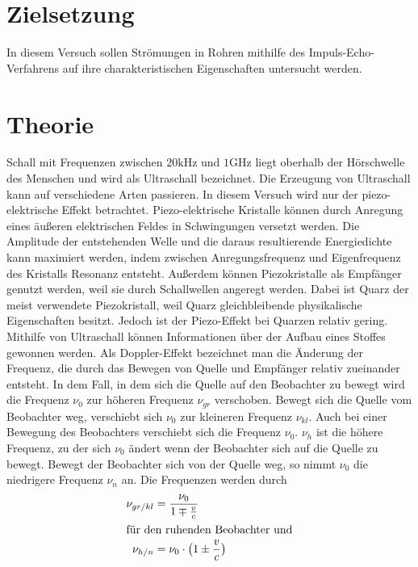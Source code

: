 \section{Zielsetzung}
\label{sec:Zielsetzung}

In diesem Versuch sollen Strömungen in Rohren mithilfe des Impuls-Echo-Verfahrens auf ihre charakteristischen Eigenschaften untersucht werden.

\section{Theorie}
\label{sec:Theorie}

Schall mit Frequenzen zwischen $20 \si{\kilo\Hz}$ und $1 \si{\giga\Hz}$ liegt oberhalb der Hörschwelle des Menschen und wird als Ultraschall
bezeichnet.
Die Erzeugung von Ultraschall kann auf verschiedene Arten passieren. In diesem Versuch wird nur der piezo-elektrische Effekt betrachtet.
Piezo-elektrische Kristalle können durch Anregung eines äußeren elektrischen Feldes in Schwingungen versetzt werden.
Die Amplitude der entstehenden Welle und die daraus resultierende Energiedichte kann maximiert werden, indem zwischen Anregungsfrequenz und Eigenfrequenz
des Kristalls Resonanz entsteht.
Außerdem können Piezokristalle als Empfänger genutzt werden, weil sie durch Schallwellen angeregt werden.
Dabei ist Quarz der meist verwendete Piezokristall, weil Quarz gleichbleibende physikalische Eigenschaften besitzt.
Jedoch ist der Piezo-Effekt bei Quarzen relativ gering.\\
Mithilfe von Ultraschall können Informationen über der Aufbau eines Stoffes gewonnen werden.
Als Doppler-Effekt bezeichnet man die Änderung der Frequenz, die durch das Bewegen von Quelle und Empfänger relativ zueinander entsteht.
In dem Fall, in dem sich die Quelle auf den Beobachter zu bewegt wird die Frequenz $\nu_0$ zur höheren Frequenz $\nu_{gr}$ verschoben.
Bewegt sich die Quelle vom Beobachter weg, verschiebt sich $\nu_0$ zur kleineren Frequenz $\nu_{kl}$.
Auch bei einer Bewegung des Beobachters verschiebt sich die Frequenz $\nu_0$.
$\nu_{h}$ ist die höhere Frequenz, zu der sich $\nu_0$ ändert wenn der Beobachter sich auf die Quelle zu bewegt. Bewegt der Beobachter
sich von der Quelle weg, so nimmt $\nu_0$ die niedrigere Frequenz $\nu_{n}$ an.
Die Frequenzen werden durch
\begin{align}
    \nu_{gr/kl}&= \frac{\nu_0}{1 \mp \frac{v}{c}}\label{eqn:nugrkl}\\
    \intertext{für den ruhenden Beobachter und}
    \nu_{h/n}&= \nu_0 \cdot \bigl(1 \pm \frac{v}{c}\bigr)\label{eqn:nuhn}\\
\end{align}
